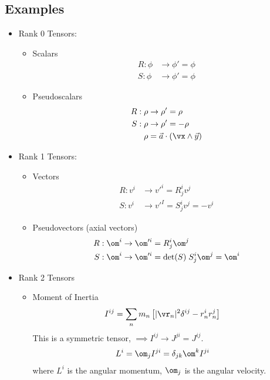 \documentclass[cplx.tex]{subfiles}
\begin{document}
\subsection{Examples}
\begin{itemize}
    \item Rank 0 Tensors:
        \begin{itemize}
            \item Scalars 
                \begin{align}
                    R:\phi &\to \phi' = \phi \\
                    S:\phi &\to \phi' = \phi
                \end{align}
            \item Pseudoscalars
                \begin{align}
                    R:\rho &\to \rho' = \rho \\
                    S:\rho &\to \rho' = -\rho \\
                    \rho &= \vec{a}\cdot(\vx \land \vec{y})
                \end{align}
        \end{itemize}
    \item Rank 1 Tensors:
        \begin{itemize}
            \item Vectors
                \begin{align}
                    R:v^i &\to v'^i = R^i_jv^j \\
                    S:v^i &\to v'^I = S^i_jv^j = -v^i
                \end{align}
            \item Pseudovectors (axial vectors)
                \begin{align}
                    R:\om^i &\to \om'^i = R^i_j\om^j \\
                    S:\om^i &\to \om'^i = \text{det}(S)\;S^i_j \om^j = \om^i
                \end{align}
        \end{itemize}
    \item Rank 2 Tensors
        \begin{itemize}
            \item Moment of Inertia
                \begin{align}
                    I^{ij} &= \sum_n m_n \left[|\vr_n|^2\delta^{ij} - r_n^ir_n^j\right]
                \end{align}
                This is a symmetric tensor, $\implies I^{ij} \to J^{ji} = J^{ij}$.
                \begin{align}
                    L^i &= \om_j I^{ji} = \delta_{jk}\om^kI^{ji}
                \end{align}
                where $L^i$ is the angular momentum, $\om_j$ is the angular velocity.
                

\end{itemize}
\end{itemize}
\end{document}
